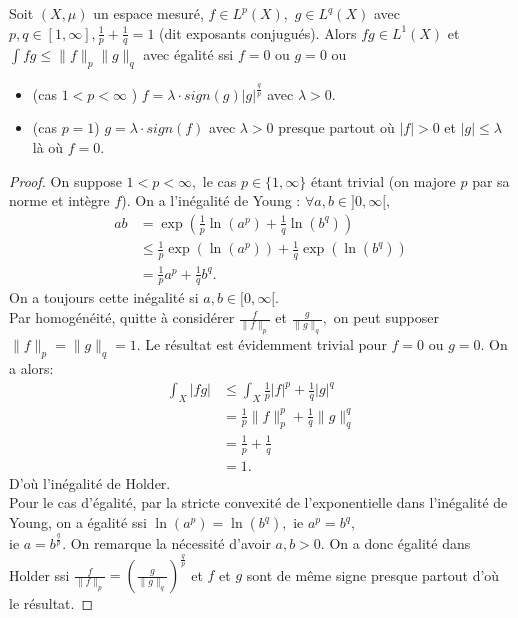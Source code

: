 \begin{propriete}
    Soit $(X, \mu)$ un espace mesuré, $f\in L^p(X),$ $g\in L^q(X)$ avec $p,q\in [1,\infty ], \frac{1}{p}+\frac{1}{q}=1$ (dit exposants conjugués). Alors $fg\in L^1(X)$ et $\int fg\le \|f\|_p\|g\|_q$ avec égalité ssi $f=0$ ou $g=0$ ou
    \begin{itemize}
        \item (cas $1<p<\infty $ ) $f=\lambda\cdot sign(g)|g|^{\frac{q}{p}} $ avec $\lambda>0$.
        \item (cas $p=1$) $g=\lambda\cdot sign(f)$ avec $\lambda>0$ presque partout où $|f| >0$ et $|g| \le \lambda$ là où $f=0.$
    \end{itemize}
\end{propriete}
\begin{proof}
    On suppose $1<p<\infty ,$ le cas $p\in \{1,\infty \} $ étant trivial (on majore $p$ par sa norme et intègre $f$). On a l'inégalité de Young : $\forall a,b\in ]0,\infty [, $
    \begin{align*}
        ab&=\exp\left( \frac{1}{p}\ln(a^p)+\frac{1}{q}\ln(b^q) \right) \\
          &\le \frac{1}{p}\exp\left( \ln(a^p) \right) +\frac{1}{q}\exp\left( \ln(b^q) \right) \\
          &= \frac{1}{p}a^p+\frac{1}{q}b^q.
    \end{align*}
    On a toujours cette inégalité si $a,b\in [0,\infty [.$\\
    Par homogénéité, quitte à considérer $\frac{f}{\|f\|_p}$ et $\frac{g}{\|g\|_q},$ on peut supposer $\|f\|_p=\|g\|_q=1.$ Le résultat est évidemment trivial pour $f=0$ ou $g=0$. On a alors:
    \begin{align*}
        \int_X|fg| &\le \int_X \frac{1}{p}|f| ^p+\frac{1}{q}|g| ^q\\
                   &= \frac{1}{p}\|f\|_p^p + \frac{1}{q}\|g\|_q^q\\
                   &= \frac{1}{p}+\frac{1}{q}\\
                   &=1.
    \end{align*}
    D'où l'inégalité de Holder.\\

    Pour le cas d'égalité, par la stricte convexité de l'exponentielle dans l'inégalité de Young, on a égalité ssi $\ln(a^p)=\ln(b^q),$ ie $a^p=b^q,$ \\ie $a=b^{\frac{q}{p}}$. On remarque la nécessité d'avoir $a,b>0.$ On a donc égalité dans Holder ssi  $\frac{f}{\|f\|_p}=\left( \frac{g}{\|g\|_q} \right) ^{\frac{q}{p}}$ et $f$ et $g$ sont de même signe presque partout d'où le résultat.
\end{proof}
